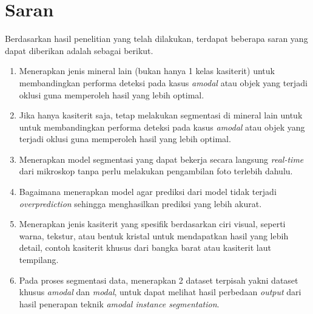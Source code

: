 \begin{enumerate}[noitemsep]
\end{enumerate} 



\section{Saran} \label{V.Saran}
Berdasarkan hasil penelitian yang telah dilakukan, terdapat beberapa saran yang dapat diberikan adalah sebagai berikut. \par
\begin{enumerate}[noitemsep]
    \item Menerapkan jenis mineral lain (bukan hanya 1 kelas kasiterit) untuk membandingkan performa deteksi pada kasus \textit{amodal} atau objek yang terjadi oklusi guna memperoleh hasil yang lebih optimal.
    \item Jika hanya kasiterit saja, tetap melakukan segmentasi di mineral lain untuk untuk membandingkan performa deteksi pada kasus \textit{amodal} atau objek yang terjadi oklusi guna memperoleh hasil yang lebih optimal. 
    \item Menerapkan model segmentasi yang dapat bekerja secara langsung \textit{real-time} dari mikroskop tanpa perlu melakukan pengambilan foto terlebih dahulu.
    \item Bagaimana menerapkan model agar prediksi dari model tidak terjadi \textit{overprediction} sehingga menghasilkan prediksi yang lebih akurat.
    \item Menerapkan jenis kasiterit yang spesifik berdasarkan ciri visual, seperti warna, tekstur, atau bentuk kristal untuk mendapatkan hasil yang lebih detail, contoh kasiterit khusus dari bangka barat atau kasiterit laut tempilang.
    \item Pada proses segmentasi data, menerapkan 2 dataset terpisah yakni dataset khusus \textit{amodal} dan \textit{modal}, untuk dapat melihat hasil perbedaan \textit{output} dari hasil penerapan teknik \textit{amodal instance segmentation}.

\end{enumerate}